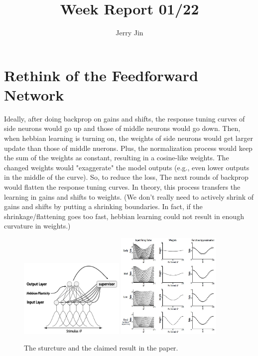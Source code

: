 \documentclass[12pt, a4paper]{article}
\title{Week Report 01/22}
\author{Jerry Jin}
\begin{document}
\maketitle

\section*{Rethink of the Feedforward Network}


Ideally, after doing backprop on gains and shifts, the response tuning curves of side neurons would go up and those of middle neurons would go down. Then, when hebbian learning is turning on, the weights of side neurons would get larger update than those of middle nuerons. Plus, the normalization process would keep the sum of the weights as constant, resulting in a cosine-like weights. The changed weights would "exaggerate" the model outputs (e.g., even lower outputs in the middle of the curve). So, to reduce the loss, The next rounds of backprop would flatten the response tuning curves. In theory, this process transfers the learning in gains and shifts to weights. (We don't really need to actively shrink of gains and shifts by putting a shrinking boundaries. In fact, if the shrinkage/flattening goes too fast, hebbian learning could not result in enough curvature in weights.)


\begin{figure}[H]
    \centering
    \includegraphics[width=0.45\textwidth]{baseline_abb05/fig/abb05_struc.png}
    \includegraphics[width=0.45\textwidth]{baseline_abb05/fig/abb05_paperresult.jpg}
    \\
    \caption{The sturcture and the claimed result in the paper.}
\end{figure}
\end{document}
